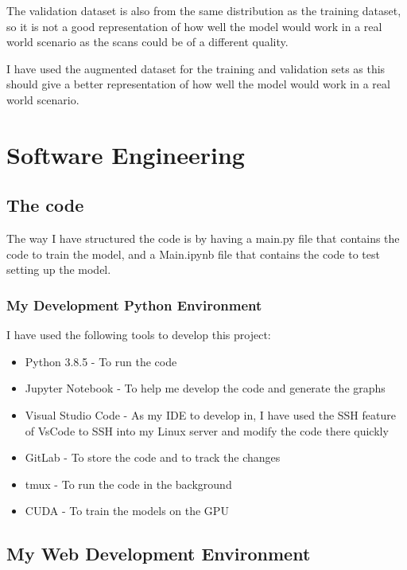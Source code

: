 \documentclass[]{final_report}
\begin{document}
The validation dataset is also from the same distribution as the training dataset,
so it is not a good representation of how well the model would work in a real world scenario
as the scans could be of a different quality.

I have used the augmented dataset for the training and validation sets as this
should give a better representation of how well the model would work in a real world scenario.




\pagebreak

\chapter{Software Engineering}

\section{The code}
The way I have structured the code is by having a main.py file that contains the code to train the model, and a Main.ipynb file that contains the code to test setting up the model.

\subsection{My Development Python Environment}
I have used the following tools to develop this project:
\begin{itemize}
  \item Python 3.8.5\cite{Python} - To run the code
  \item Jupyter Notebook\cite{Jupyter} - To help me develop the code and generate the graphs
  \item Visual Studio Code\cite{VsCode} - As my IDE to develop in, I have used the SSH feature of VsCode to SSH into my Linux server and modify the code there quickly
  \item GitLab\cite{RHULGitLab} - To store the code and to track the changes
  \item tmux\cite{tmux} - To run the code in the background
  \item CUDA\cite{CUDA} - To train the models on the GPU
\end{itemize}

\section{My Web Development Environment}
\end{document}
